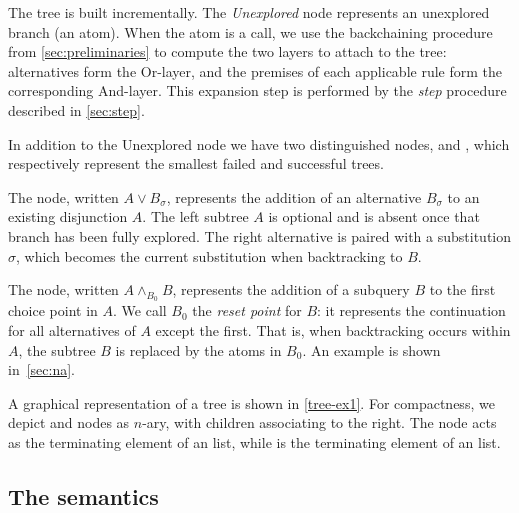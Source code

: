 The tree is built incrementally. The \emph{Unexplored} node
represents an unexplored branch (an atom). When the atom is a
call, we use the backchaining procedure from
\cref{sec:preliminaries} to compute the two layers to attach to the tree:
alternatives form the Or-layer, and the premises of each applicable rule form
the corresponding And-layer. This expansion step is performed by the
\emph{step} procedure described in \cref{sec:step}.

In addition to the Unexplored node we have two distinguished nodes,
\koC and \okC, which respectively represent the smallest failed and successful
trees.

The \orC node, written \(A \lor B_\sigma\), represents the addition of an
alternative \(B_\sigma\) to an existing disjunction $A$. The left subtree
\(A\) is optional and is absent once that branch has been fully explored.
The right alternative is paired with a substitution \(\sigma\), which becomes
the current substitution when backtracking to \(B\).

The \andC{} node, written \(A \land_{B_0} B\), represents the addition
of a subquery \(B\) to the first choice point in \(A\). We call
\(B_0\) the \emph{reset point} for \(B\): it represents the
continuation for all alternatives of \(A\) except the first. That is,
when backtracking occurs within \(A\), the subtree \(B\) is replaced by
the atoms in \(B_0\). An example is shown in~\cref{sec:na}.

A graphical representation of a tree is shown in \cref{tree-ex1}. For
compactness, we depict \andC and \orC nodes as $n$-ary,
with children associating to the right. The \koC node acts as the terminating
element of an \orC list, while \okC is the terminating element of an \andC
list.

%   
%   

%   



\subsection{The semantics}


